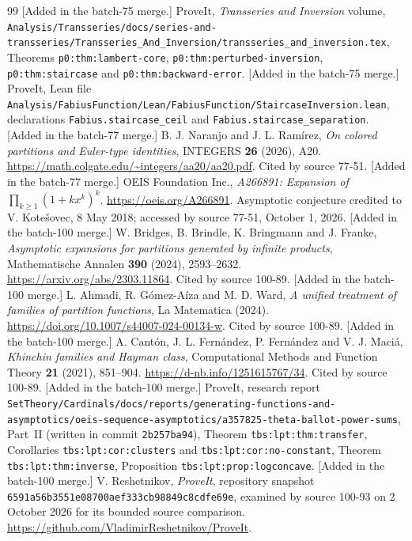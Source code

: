 \documentclass[11pt]{article}
\numberwithin{equation}{section}
\theoremstyle{definition}\newtheorem{definition}[theorem]{Definition}
\theoremstyle{remark}\newtheorem{remark}[theorem]{Remark}
\begin{document}
{\begin{thebibliography}{99}
 [Added in the batch-75 merge.] ProveIt, \emph{Transseries and
Inversion} volume,
\nolinkurl{Analysis/Transseries/docs/series-and-transseries/Transseries_And_Inversion/transseries_and_inversion.tex},
Theorems \texttt{p0:thm:lambert-core}, \texttt{p0:thm:perturbed-inversion},
\texttt{p0:thm:staircase} and \texttt{p0:thm:backward-error}.
 [Added in the batch-75 merge.] ProveIt, Lean file
\nolinkurl{Analysis/FabiusFunction/Lean/FabiusFunction/StaircaseInversion.lean},
declarations \texttt{Fabius.staircase\_ceil} and
\texttt{Fabius.staircase\_separation}.
 [Added in the batch-77 merge.] B. J. Naranjo and J. L. Ram\'irez,
\emph{On colored partitions and Euler-type identities}, INTEGERS \textbf{26}
(2026), A20. \url{https://math.colgate.edu/~integers/aa20/aa20.pdf}.  Cited by
source 77-51.
 [Added in the batch-77 merge.] OEIS Foundation Inc.,
\emph{A266891: Expansion of $\prod_{k\ge1}(1+kx^k)^k$}.
\url{https://oeis.org/A266891}.  Asymptotic conjecture credited to
V. Kote\v{s}ovec, 8 May 2018; accessed by source 77-51, October 1, 2026.
 [Added in the batch-100 merge.] W. Bridges, B. Brindle,
K. Bringmann and J. Franke, \emph{Asymptotic expansions for partitions
generated by infinite products}, Mathematische Annalen \textbf{390} (2024),
2593--2632.  \url{https://arxiv.org/abs/2303.11864}.  Cited by source 100-89.
 [Added in the batch-100 merge.] L. Ahmadi, R. G\'omez-A\'iza and
M. D. Ward, \emph{A unified treatment of families of partition functions}, La
Matematica (2024).  \url{https://doi.org/10.1007/s44007-024-00134-w}.  Cited by
source 100-89.
 [Added in the batch-100 merge.] A. Cant\'on, J. L.
Fern\'andez, P. Fern\'andez and V. J. Maci\'a, \emph{Khinchin families and
Hayman class}, Computational Methods and Function Theory \textbf{21} (2021),
851--904.  \url{https://d-nb.info/1251615767/34}.  Cited by source 100-89.
 [Added in the batch-100 merge.] ProveIt, research report
\nolinkurl{SetTheory/Cardinals/docs/reports/generating-functions-and-asymptotics/oeis-sequence-asymptotics/a357825-theta-ballot-power-sums},
Part~II (written in commit \texttt{2b257ba94}), Theorem
\texttt{tbs:lpt:thm:transfer}, Corollaries \texttt{tbs:lpt:cor:clusters} and
\texttt{tbs:lpt:cor:no-constant}, Theorem \texttt{tbs:lpt:thm:inverse},
Proposition \texttt{tbs:lpt:prop:logconcave}.
 [Added in the batch-100 merge.] V. Reshetnikov,
\emph{ProveIt}, repository snapshot
\texttt{6591a56b3551e08700aef333cb98849c8cdfe69e}, examined by source 100-93
on 2 October 2026 for its bounded source comparison.
\url{https://github.com/VladimirReshetnikov/ProveIt}.
\end{thebibliography}
}
\end{document}
